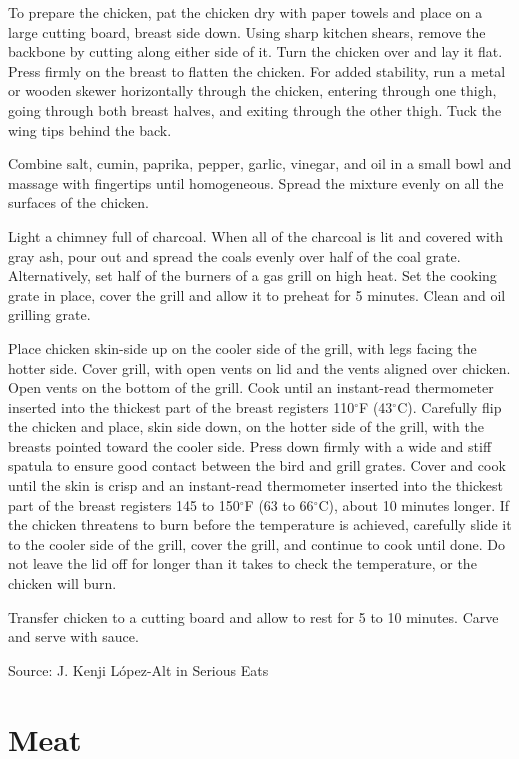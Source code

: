 \documentclass[letterpaper]{recipePMG}
\renewcommand{\deg}{$^\circ$}
\begin{document}
To prepare the chicken, pat the chicken dry with paper towels and place on a large cutting board, breast side down. Using sharp kitchen shears, remove the backbone by cutting along either side of it. Turn the chicken over and lay it flat. Press firmly on the breast to flatten the chicken. For added stability, run a metal or wooden skewer horizontally through the chicken, entering through one thigh, going through both breast halves, and exiting through the other thigh. Tuck the wing tips behind the back.

Combine salt, cumin, paprika, pepper, garlic, vinegar, and oil in a small bowl and massage with fingertips until homogeneous. Spread the mixture evenly on all the surfaces of the chicken. 

Light a chimney full of charcoal. When all of the charcoal is lit and covered with gray ash, pour out and spread the coals evenly over half of the coal grate. Alternatively, set half of the burners of a gas grill on high heat. Set the cooking grate in place, cover the grill and allow it to preheat for 5 minutes. Clean and oil grilling grate. 

Place chicken skin-side up on the cooler side of the grill, with legs facing the hotter side. Cover grill, with open vents on lid and the vents aligned over chicken. Open vents on the bottom of the grill. Cook until an instant-read thermometer inserted into the thickest part of the breast registers 110\deg F (43\deg C). Carefully flip the chicken and place, skin side down, on the hotter side of the grill, with the breasts pointed toward the cooler side. Press down firmly with a wide and stiff spatula to ensure good contact between the bird and grill grates. Cover and cook until the skin is crisp and an instant-read thermometer inserted into the thickest part of the breast registers 145 to 150\deg F (63 to 66\deg C), about 10 minutes longer. If the chicken threatens to burn before the temperature is achieved, carefully slide it to the cooler side of the grill, cover the grill, and continue to cook until done. Do not leave the lid off for longer than it takes to check the temperature, or the chicken will burn.

Transfer chicken to a cutting board and allow to rest for 5 to 10 minutes. Carve and serve with sauce. 

Source:  J. Kenji L\'{o}pez-Alt in Serious Eats




\chapter{Meat}
\end{document}
